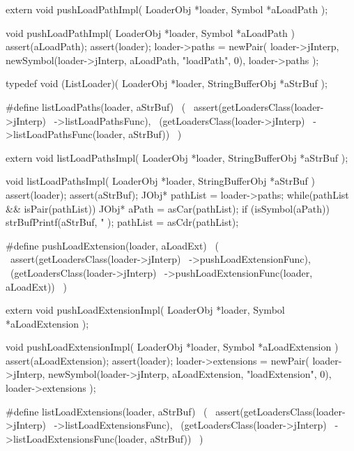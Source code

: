 \startCHeader
extern void pushLoadPathImpl(
  LoaderObj *loader,
  Symbol    *aLoadPath
);
\stopCHeader
{}

\startCCode
void pushLoadPathImpl(
  LoaderObj *loader,
  Symbol    *aLoadPath
) {
  assert(aLoadPath);
  assert(loader);
  loader->paths =
    newPair(
      loader->jInterp,
      newSymbol(loader->jInterp, aLoadPath, "loadPath", 0),
      loader->paths
    );
}
\stopCCode

\startCHeader
typedef void (ListLoader)(
  LoaderObj       *loader,
  StringBufferObj *aStrBuf
);

#define listLoadPaths(loader, aStrBuf)      \
  (                                         \
    assert(getLoadersClass(loader->jInterp) \
      ->listLoadPathsFunc),                 \
    (getLoadersClass(loader->jInterp)       \
      ->listLoadPathsFunc(loader, aStrBuf)) \
  )
\stopCHeader

\setCHeaderStream{private}
\startCHeader
extern void listLoadPathsImpl(
  LoaderObj       *loader,
  StringBufferObj *aStrBuf
);
\stopCHeader
{}

\startCCode
void listLoadPathsImpl(
  LoaderObj       *loader,
  StringBufferObj *aStrBuf
) {
  assert(loader);
  assert(aStrBuf);
  JObj* pathList = loader->paths;
  while(pathList && isPair(pathList)) {
    JObj* aPath = asCar(pathList);
    if (isSymbol(aPath)) {
      strBufPrintf(aStrBuf,
        "%
      );
    }
    pathList = asCdr(pathList);
  }  
}
\stopCCode

\startCHeader
#define pushLoadExtension(loader, aLoadExt)       \
  (                                               \
    assert(getLoadersClass(loader->jInterp)       \
      ->pushLoadExtensionFunc),                   \
    (getLoadersClass(loader->jInterp)             \
      ->pushLoadExtensionFunc(loader, aLoadExt))  \
  )
\stopCHeader

\startCHeader
extern void pushLoadExtensionImpl(
  LoaderObj *loader,
  Symbol    *aLoadExtension
);
\stopCHeader
\setCHeaderStream{public}

\startCCode
void pushLoadExtensionImpl(
  LoaderObj *loader,
  Symbol    *aLoadExtension
) {
  assert(aLoadExtension);
  assert(loader);
  loader->extensions =
    newPair(
      loader->jInterp, 
      newSymbol(loader->jInterp, aLoadExtension, "loadExtension", 0),
      loader->extensions
    );
}
\stopCCode

\startCHeader
#define listLoadExtensions(loader, aStrBuf)      \
  (                                              \
    assert(getLoadersClass(loader->jInterp)      \
      ->listLoadExtensionsFunc),                 \
    (getLoadersClass(loader->jInterp)            \
      ->listLoadExtensionsFunc(loader, aStrBuf)) \
  )
\stopCHeader

